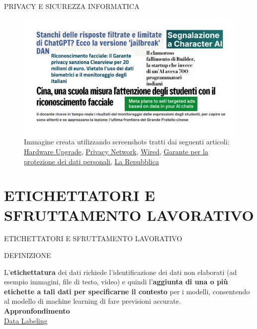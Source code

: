 \documentclass[aspectratio=1610]{beamer}
\begin{document}
\begin{frame}{PRIVACY E SICUREZZA INFORMATICA}
    \begin{figure}
        \includegraphics[width=.9\linewidth]{img/privacyesicurezza.png}
        \caption{
            Immagine creata utilizzando screenshots tratti dai seguenti articoli:
            \href{https://www.hwupgrade.it/news/web/stanchi-delle-risposte-filtrate-e-limitate-di-chatgpt-ecco-la-versione-jailbreak-dan_113918.html}{Hardware Upgrade}, 
            \href{https://privacy-network.it/news/segnalazione/segnalazione-a-character-ai/}{Privacy Network}, 
            \href{https://www.wired.it/attualita/tech/2018/05/21/cina-scuola-attenzione-studenti-riconoscimento-facciale/}{Wired}, 
            \href{https://www.garanteprivacy.it/home/docweb/-/docweb-display/docweb/9751323}{Garante per la protezione dei dati personali}, 
            \href{https://www.repubblica.it/tecnologia/2025/06/06/news/builder_ai_fallimento_indiani_intelligenza_artificiale-424651787/}{La Repubblica}
        }
    \end{figure}
\end{frame}

\section{ETICHETTATORI E SFRUTTAMENTO LAVORATIVO}

\begin{frame}{ETICHETTATORI E SFRUTTAMENTO LAVORATIVO}
    \begin{alertblock}{DEFINIZIONE}
        \begin{minipage}{0.96\linewidth}
            \justifying
            L'\textbf{etichettatura} dei dati richiede l'identificazione dei dati non 
            elaborati (ad esempio immagini, file di testo, video) e quindi l'\textbf{aggiunta di una o 
            più etichette a tali dati per specificarne il contesto} per i modelli, consentendo al 
            modello di machine learning di fare previsioni accurate.\\
            \bigskip
            \tiny{\textbf{Appronfondimento}}\\
            \tiny{\href{https://www.ibm.com/it-it/topics/data-labeling}{Data Labeling}}
        \end{minipage}
    \end{alertblock}
\end{frame}
\end{document}
